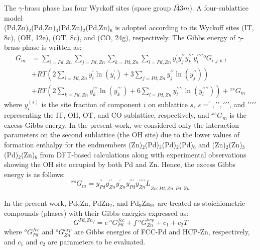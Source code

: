 The $\gamma$-brass phase has four Wyckoff sites (space group $I\bar{4}3m$). A four-sublattice model \\ (Pd,Zn)$_2$(Pd,Zn)$_3$(Pd,Zn)$_2$(Pd,Zn)$_6$ is adopted according to its Wyckoff sites (IT, 8c), (OH, 12e), (OT, 8c), and (CO, 24g), respectively. The Gibbs energy of $\gamma$-brass phase is written as: 
\begin{equation} \label{intermetallics:gammaG}
    \begin{aligned}
    G_m&=\sum_{i=Pd,Zn}\sum_{j=Pd,Zn}\sum_{k=Pd,Zn}\sum_{l=Pd,Zn}{y_i^\prime y_j^{\prime\prime}y_k^{\prime\prime\prime}y_l^{\prime\prime\prime\prime}{{^o}G}_{i:j:k:l}}\\&+RT\left(2\sum_{i=Pd,Zn}{y_i^{\prime}\ln{\left(y_i^{\prime}\right)}}+3\sum_{j=Pd,Zn}{y_j^{\prime\prime}\ln{\left(y_j^{\prime\prime}\right)}}\right)\\&+RT\left(2\sum_{k=Pd,Zn}{y_k^{\prime\prime\prime}\ln{\left(y_k^{\prime\prime\prime}\right)}}+6\sum_{l=Pd,Zn}{y_l^{\prime\prime\prime\prime}\ln{\left(y_l^{\prime\prime\prime\prime}\right)}}\right)+{^{xs}}G_m
    \end{aligned}
\end{equation}
where $y_i^{(s)}$ is the site fraction of component $i$ on sublattice $s$, $s=^\prime, \prime\prime, \prime\prime\prime$, and $\prime\prime\prime\prime$ representing the IT, OH, OT, and CO sublattice, respectively, and ${^{xs}}G_m$ is the excess Gibbs energy. In the present work, we considered only the interaction parameters on the second sublattice (the OH site) due to the lower values of formation enthalpy for the endmembers (Zn)$_2$(Pd)$_3$(Pd)$_2$(Pd)$_6$ and (Zn)$_2$(Zn)$_3$(Pd)$_2$(Zn)$_6$ from DFT-based calculations along with experimental observations \cite{strom1969x, gourdon2006intergrowth} showing the OH site occupied by both Pd and Zn. Hence, the excess Gibbs energy is as follows:
\begin{equation} \label{intermetallics:gammaGex}
    {^{xs}}G_m=y_{Pd}^{\prime\prime}y_{Zn}^{\prime\prime}y_{Zn}^\prime y_{Pd}^{\prime\prime\prime}{y_{Zn}^{\prime\prime\prime\prime}L}_{Zn:Pd,Zn:Pd:Zn}
\end{equation}

In the present work, Pd$_2$Zn, PdZn$_2$, and Pd$_9$Zn$_{91}$ are treated as stoichiometric compounds (phases) with their Gibbs energies expressed as:
\begin{equation} \label{intermetallics:stoiG}
    G^{{Pd}_e{Zn}_f}=e\:{^o}G_{Pd}^{fcc}+f\:{^o}G_{Zn}^{hcp}+c_1+c_2T
\end{equation}
where ${^o}G_{Pd}^{fcc}$ and ${^o}G_{Zn}^{hcp}$ are Gibbs energies of FCC-Pd and HCP-Zn, respectively, and $c_1$ and $c_2$ are parameters to be evaluated.

